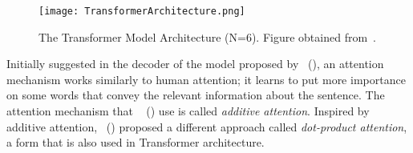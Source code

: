 \begin{figure}
    \centering
    \texttt{[image: TransformerArchitecture.png]}
    \caption[The Transformer Model Architecture.]{The Transformer Model Architecture (N=6). Figure obtained from~\parencite{AttentionIsAllYouNeed_Vaswani}.}
    \label{fig:transformerArchitecture}
\end{figure}
Initially suggested in the decoder of the model proposed by~\citeauthor{NeuralMachineTranslationByJointlyLearning_Bahdanau} (\citeyear{NeuralMachineTranslationByJointlyLearning_Bahdanau}), an attention mechanism works similarly to human attention; it learns to put more importance on some words that convey the relevant information about the sentence. The attention mechanism that ~\citeauthor{NeuralMachineTranslationByJointlyLearning_Bahdanau} (\citeyear{NeuralMachineTranslationByJointlyLearning_Bahdanau}) use is called \emph{additive attention}. Inspired by additive attention,~\citeauthor{EffectiveApproachesToAttentionBased_Luong} (\citeyear{EffectiveApproachesToAttentionBased_Luong}) proposed a different approach called \emph{dot-product attention}, a form  that is also used in Transformer architecture.\\
